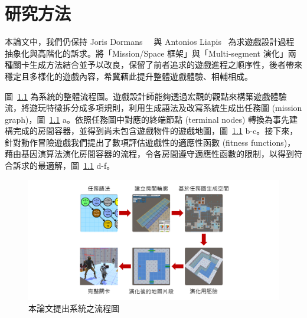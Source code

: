 \newcommand{\missionalphabetnode}[2]{{\texttt{[image: figures/mission-grammars-alphabet/\#1.png]}}}
\newcommand{\missioninstruction}[1]{{\begin{minipage}{.3\textwidth}\texttt{[image: figures/mission-grammars-ins-rep/\#1.png]}\end{minipage}}}

\chapter{研究方法}
\label{cha:methodology}

本論文中，我們仍保持 Joris Dormans~\cite{dormans2010adventures}~\cite{dormans2012engineering} 與 Antonios Liapis~\cite{liapis2013generating} 為求遊戲設計過程抽象化與高階化的訴求。將「Mission/Space 框架」與「Multi-segment 演化」兩種關卡生成方法結合並予以改良，保留了前者追求的遊戲進程之順序性，後者帶來穩定且多樣化的遊戲內容，希冀藉此提升整體遊戲體驗、相輔相成。

圖~\ref{fig:system-framework} 為系統的整體流程圖。遊戲設計師能夠透過宏觀的觀點來構築遊戲體驗流，將遊玩特徵拆分成多項規則，利用生成語法及改寫系統生成出任務圖 (mission graph)，圖~\ref{fig:system-framework} a。依照任務圖中對應的終端節點 (terminal nodes) 轉換為事先建構完成的房間容器，並得到尚未包含遊戲物件的遊戲地圖，圖~\ref{fig:system-framework} b-c。接下來，針對動作冒險遊戲我們提出了數項評估遊戲性的適應性函數 (fitness functions)，藉由基因演算法演化房間容器的流程，令各房間遵守適應性函數的限制，以得到符合訴求的最適解，圖~\ref{fig:system-framework} d-f。

\begin{figure}[!htb]
  \begin{center}
    \includegraphics[width=1.0\textwidth]{figures/系統框架.png}
    \caption{本論文提出系統之流程圖} 
    \label{fig:system-framework}
  \end{center}
\end{figure}

